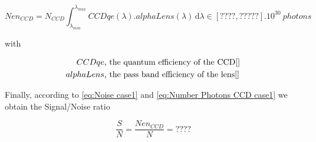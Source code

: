 \begin{equation}
\label{eq:Number Photons CCD case1}
Nen_{CCD}= N_{CCD}\int_{\lambda_{min}}^{\lambda_{max}}CCDqe(\lambda).alphaLens(\lambda) \, \mathrm d\lambda \in [????, ?????].10^{30} \ photons
\end{equation}

with

\begin{align*}
CCDqe & \mbox{, the quantum efficiency of the CCD\ref{}}\\
alphaLens & \mbox{, the pass band efficiency of the lens\ref{}}
\end{align*}

Finally, according to \eqref{eq:Noise case1} and \eqref{eq:Number Photons CCD case1} we obtain the Signal/Noise ratio 

\begin{equation}
\label{eq:Signal Noise Ratio case1}
\frac{S}{N} = \frac{Nen_{CCD}}{N} = ????
\end{equation}



